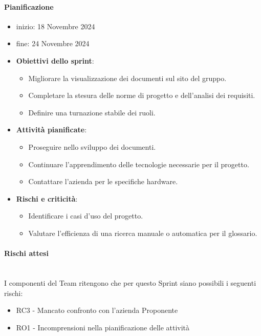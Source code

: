 \documentclass{article}
\begin{document}
                \paragraph{Pianificazione}
                \begin{itemize}
                    \item inizio: 18 Novembre 2024
                    \item fine: 24 Novembre 2024
                \end{itemize}
                \begin{itemize}
                    \item \textbf{Obiettivi dello sprint}:
                        \begin{itemize}
                            \item Migliorare la visualizzazione dei documenti sul sito del gruppo.
                            \item Completare la stesura delle norme di progetto e dell'analisi dei requisiti.
                            \item Definire una turnazione stabile dei ruoli.
                        \end{itemize}
                    \item \textbf{Attività pianificate}:
                        \begin{itemize}
                            \item Proseguire nello sviluppo dei documenti.
                            \item Continuare l'apprendimento delle tecnologie necessarie per il progetto.
                            \item Contattare l'azienda per le specifiche hardware.
                        \end{itemize}
                    \item \textbf{Rischi e criticità}:
                        \begin{itemize}
                            \item Identificare i casi d'uso del progetto.
                            \item Valutare l'efficienza di una ricerca manuale o automatica per il glossario.
                        \end{itemize}
                \end{itemize}

                \paragraph{Rischi attesi}\mbox{}\\
                I componenti del Team ritengono che per questo Sprint siano possibili i seguenti rischi:
                \begin{itemize}
                    \item RC3 - Mancato confronto con l’azienda Proponente
                    \item RO1 - Incomprensioni nella pianificazione delle attività
                \end{itemize}
\end{document}
